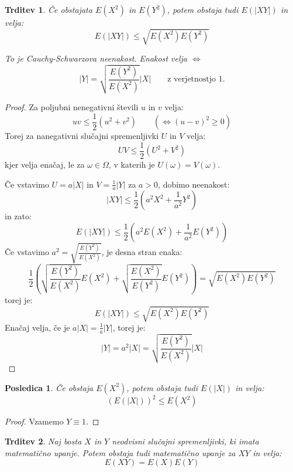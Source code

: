 \documentclass[12pt]{book}
\def\n{\noindent}
\theoremstyle{definition}
\theoremstyle{plain}
\theoremstyle{plain}
\newtheorem{trditev}{Trditev}
\theoremstyle{plain}
\newtheorem{posledica}{Posledica}
\theoremstyle{remark}
\begin{document}
\begin{trditev}
    Če obstajata $E\left(X^2\right)$ in $E\left(Y^2\right)$, potem obstaja tudi $E(|X Y|)$ in velja: 
    $$
    E(|X Y|) \leq \sqrt{E\left(X^2\right) E\left(Y^2\right)}
    $$
    
    \n To je Cauchy-Schwarzova neenakost. Enakost velja $\iff$ 
    $$
    |Y|=\sqrt{\frac{E\left(Y^2\right)}{E\left(X^2\right)}} |X| \qquad \text{z verjetnostjo $1$.}
    $$ 
\end{trditev}

\begin{proof}
    Za poljubni nenegativni števili $u$ in $v$ velja: 
    $$
    u v \leq \frac{1}{2}\left(u^2+v^2\right) \qquad \left(\iff (u-v)^2 \geq 0 \right)
    $$
    Torej za nanegativni slučajni spremenljivki $U$ in $V$ velja:
    $$
    U V \leq \frac{1}{2}\left(U^2+V^2\right)
    $$
    kjer velja enačaj, le za $\omega \in \Omega$, v katerih je $U(\omega) = V(\omega)$.

    \n Če vstavimo $U=a|X|$ in $V=\frac{1}{a} |Y|$ za $a>0$, dobimo neenakost: 
    $$
    |X Y| \leq \frac{1}{2}\left(a^2 X^2+\frac{1}{a^2} Y^2\right)
    $$
    in zato:
    $$
    E(|XY|) \leq \frac{1}{2}\left(a^2 E\left(X^2\right)+\frac{1}{a^2} E\left(Y^2\right)\right)
    $$  
    Če vstavimo $a^2=\sqrt{\frac{E\left(Y^2\right)}{E\left(X^2\right)}}$, je desna stran enaka: 
    $$
    \frac{1}{2}\left(\sqrt{\frac{E\left(Y^2\right)}{E\left(X^2\right)}}  E\left(X^2\right)+\sqrt{\frac{E\left(X^2\right)}{E\left(Y^2\right)}}  E\left(Y^2\right)\right) = \sqrt{E\left(X^2\right) E\left(Y^2\right)}
    $$
    torej je: 
    $$
    E(|X Y|) \leq \sqrt{E\left(X^2\right) E\left(Y^2\right)}
    $$
    Enačaj velja, če je $a |X|= \frac{1}{a}|Y|$, torej je:
    $$
    |Y|=a^2 |X|=\sqrt{\frac{E\left(Y^2\right)}{E\left(X^2\right)}} |X|
    $$
\end{proof}

\begin{posledica}
    Če obstaja $E\left(X^2\right)$, potem obstaja tudi $E(|X|)$ in velja:
    $$
    (E(|X|))^2 \leq E\left(X^2\right)
    $$
\end{posledica}

\begin{proof}
    Vzamemo $Y \equiv 1$. 
\end{proof}

\begin{trditev}
    Naj bosta $X$ in $Y$ neodvisni slučajni spremenljivki, ki imata matematično upanje. Potem obstaja tudi matematično upanje za $XY$ in velja: 
    $$
    E(X Y)=E(X) E(Y)
    $$
\end{trditev}
\end{document}

